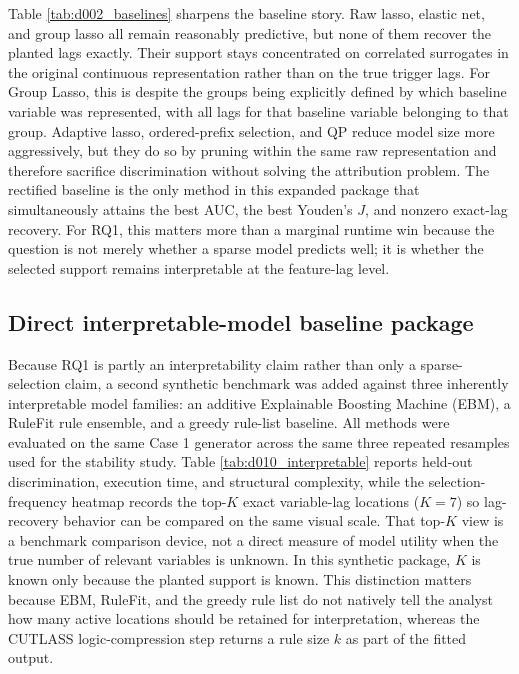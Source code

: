 Table \ref{tab:d002_baselines} sharpens the baseline story. Raw lasso, elastic net, and group lasso all remain reasonably predictive, but none of them recover the planted lags exactly. Their support stays concentrated on correlated surrogates in the original continuous representation rather than on the true trigger lags. For Group Lasso, this is despite the groups being explicitly defined by which baseline variable was represented, with all lags for that baseline variable belonging to that group. Adaptive lasso, ordered-prefix selection, and QP reduce model size more aggressively, but they do so by pruning within the same raw representation and therefore sacrifice discrimination without solving the attribution problem. The rectified baseline is the only method in this expanded package that simultaneously attains the best AUC, the best Youden's $J$, and nonzero exact-lag recovery. For RQ1, this matters more than a marginal runtime win because the question is not merely whether a sparse model predicts well; it is whether the selected support remains interpretable at the feature-lag level.

\subsection{Direct interpretable-model baseline package}

Because RQ1 is partly an interpretability claim rather than only a sparse-selection claim, a second synthetic benchmark was added against three inherently interpretable model families: an additive Explainable Boosting Machine (EBM), a RuleFit rule ensemble, and a greedy rule-list baseline. All methods were evaluated on the same Case 1 generator across the same three repeated resamples used for the stability study. Table \ref{tab:d010_interpretable} reports held-out discrimination, execution time, and structural complexity, while the selection-frequency heatmap records the top-$K$ exact variable-lag locations ($K=7$) so lag-recovery behavior can be compared on the same visual scale. That top-$K$ view is a benchmark comparison device, not a direct measure of model utility when the true number of relevant variables is unknown. In this synthetic package, $K$ is known only because the planted support is known. This distinction matters because EBM, RuleFit, and the greedy rule list do not natively tell the analyst how many active locations should be retained for interpretation, whereas the CUTLASS logic-compression step returns a rule size $k$ as part of the fitted output.

